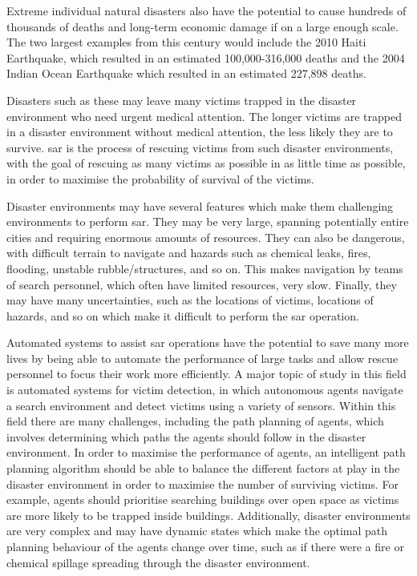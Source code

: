 \documentclass[conference]{IEEEtran}
\begin{document}
Extreme individual natural disasters also have the potential to cause hundreds of thousands of deaths and long-term economic damage if on a large enough scale.
The two largest examples from this century would include the 2010 Haiti Earthquake, which resulted in an estimated 100,000-316,000 deaths and the 2004 Indian Ocean Earthquake which resulted in an estimated 227,898 deaths.

Disasters such as these may leave many victims trapped in the disaster environment who need urgent medical attention.
The longer victims are trapped in a disaster environment without medical attention, the less likely they are to survive.
\gls{sar} is the process of rescuing victims from such disaster environments, with the goal of rescuing as many victims as possible in as little time as possible, in order to maximise the probability of survival of the victims.

Disaster environments may have several features which make them challenging environments to perform \gls{sar}.
They may be very large, spanning potentially entire cities and requiring enormous amounts of resources.
They can also be dangerous, with difficult terrain to navigate and hazards such as chemical leaks, fires, flooding, unstable rubble/structures, and so on.
This makes navigation by teams of search personnel, which often have limited resources, very slow.
Finally, they may have many uncertainties, such as the locations of victims, locations of hazards, and so on which make it difficult to perform the \gls{sar} operation.

Automated systems to assist \gls{sar} operations have the potential to save many more lives by being able to automate the performance of large tasks and allow rescue personnel to focus their work more efficiently.
A major topic of study in this field is automated systems for victim detection, in which autonomous agents navigate a search environment and detect victims using a variety of sensors.
Within this field there are many challenges, including the path planning of agents, which involves determining which paths the agents should follow in the disaster environment.
In order to maximise the performance of agents, an intelligent path planning algorithm should be able to balance the different factors at play in the disaster environment in order to maximise the number of surviving victims.
For example, agents should prioritise searching buildings over open space as victims are more likely to be trapped inside buildings.
Additionally, disaster environments are very complex and may have dynamic states which make the optimal path planning behaviour of the agents change over time, such as if there were a fire or chemical spillage spreading through the disaster environment.
\end{document}

